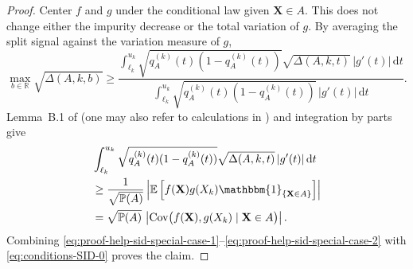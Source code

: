 \documentclass[11pt]{article}
\theoremstyle{plain}
\theoremstyle{definition}
\theoremstyle{remark}
\theoremstyle{plain}
\newcommand{\bX}{\mathbf{X}}
\renewcommand{\P}{\mathbb{P}}
\newcommand{\E}{\mathbb{E}}
\newcommand{\Cov}{\textnormal{Cov}}
\newcommand{\1}{\mathbbm{1}}
\begin{document}
\begin{proof}
    Center $f$ and $g$ under the conditional law given
    $\bX\in A$.  This does not change either the impurity
    decrease or the total variation of $g$.  By averaging the
    split signal against the variation measure of $g$,
    \begin{equation}\label{eq:proof-help-sid-special-case-1}
    \max_{b \in \mathbb{R}} \sqrt{\Delta(A, k, b)} \geq \frac{\int_{\ell_k}^{u_k} \sqrt{q_A^{(k)}(t)(1 - q_A^{(k)}(t))}\sqrt{\Delta(A, k, t)}\,|g'(t)|\,\mathrm{d}t}{\int_{\ell_k}^{u_k} \sqrt{q_A^{(k)}(t)(1 - q_A^{(k)}(t))}\,|g'(t)|\,\mathrm{d}t}.
    \end{equation}
    Lemma~B.1 of \citet{Mazumder2024} (one may also refer to calculations in \citet{klusowski2020sparse}) and integration by parts
    give
    \begin{equation}
    \begin{aligned}\label{eq:proof-help-sid-special-case-2}
        & \int_{\ell_k}^{u_k} \sqrt{q_A^{(k)}(t)(1 - q_A^{(k)}(t))}\sqrt{\Delta(A, k, t)}\,|g'(t)|\,\mathrm{d}t \\
        &\geq \frac{1}{\sqrt{\P(A)}}
        \left|\E\left[f(\bX)g(X_k)\1_{\{\bX\in A\}}\right]\right| \\
        &=\sqrt{\P(A)}\,
        \left|\Cov\bigl(f(\bX),g(X_k)\mid\bX\in A\bigr)\right|.
    \end{aligned}
    \end{equation}
    Combining \eqref{eq:proof-help-sid-special-case-1}--\eqref{eq:proof-help-sid-special-case-2}
    with \eqref{eq:conditions-SID-0} proves the claim.
\end{proof}
\end{document}
